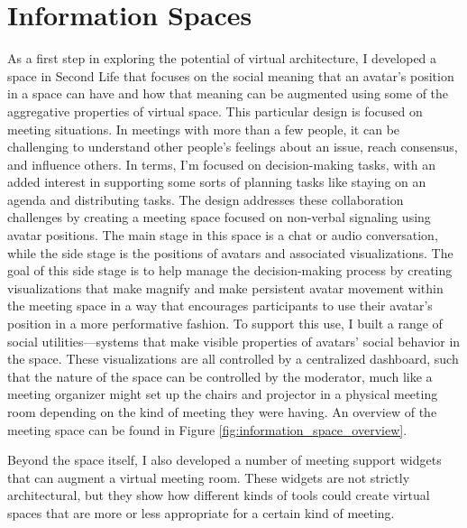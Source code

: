 \section{Information Spaces}
As a first step in exploring the potential of virtual architecture, I developed a space in Second Life that focuses on the social meaning that an avatar's position in a space can have and how that meaning can be augmented using some of the aggregative properties of virtual space. \citep{Harry:2008ww} This particular design is focused on meeting situations. In meetings with more than a few people, it can be challenging to understand other people's feelings about an issue, reach consensus, and influence others. In  terms, I'm focused on decision-making tasks, with an added interest in supporting some sorts of planning tasks like staying on an agenda and distributing tasks. The design addresses these collaboration challenges by creating a meeting space focused on non-verbal signaling using avatar positions. The main stage in this space is a chat or audio conversation, while the side stage is the positions of avatars and associated visualizations. The goal of this side stage is to help manage the decision-making process by creating visualizations that make magnify and make persistent avatar movement within the meeting space in a way that encourages participants to use their avatar's position in a more performative fashion. To support this use, I built a range of social utilities---systems that make visible properties of avatars' social behavior in the space. These visualizations are all controlled by a centralized dashboard, such that the nature of the space can be controlled by the moderator, much like a meeting organizer might set up the chairs and projector in a physical meeting room depending on the kind of meeting they were having. An overview of the meeting space can be found in  Figure \ref{fig:information_space_overview}.

Beyond the space itself, I also developed a number of meeting support widgets that can augment a virtual meeting room. These widgets are not strictly architectural, but they show how different kinds of tools could create virtual spaces that are more or less appropriate for a certain kind of meeting.

